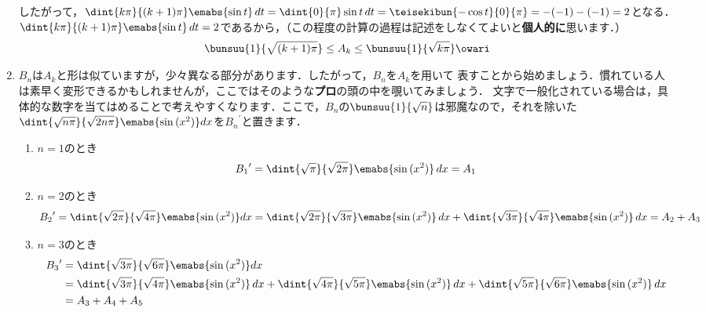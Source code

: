 \documentclass[../../../doc/main]{subfiles}
\begin{document}
\begin{enumerate}
            \textcolor{myBlue2}{したがって，$\dint{k\pi}{(k+1)\pi}\emabs{\sin{t}}\,dt=\dint{0}{\pi}\sin{t}\,dt=\teisekibun{-\cos{t}}{0}{\pi}=-(-1)-(-1)=2$となる．} \\
            $\dint{k\pi}{(k+1)\pi}\emabs{\sin{t}}\,dt=2$であるから，\textcolor{myBlue2}{（この程度の計算の過程は記述をしなくてよいと{\bf 個人的に}思います．）}
            \begin{align*}
                \bunsuu{1}{\sqrt{(k+1)\pi}}\leq A_k \leq \bunsuu{1}{\sqrt{k\pi}}\owari
            \end{align*}
            \item [\kakkoni] \textcolor{myBlue2}{$B_n$は$A_k$と形は似ていますが，少々異なる部分があります．したがって，$B_n$を$A_k$を用いて
            表すことから始めましょう．慣れている人は素早く変形できるかもしれませんが，ここではそのような{\bf プロ}の頭の中を覗いてみましょう．
            文字で一般化されている場合は，具体的な数字を当てはめることで考えやすくなります．ここで，$B_n$の$\bunsuu{1}{\sqrt{n}}$は邪魔なので，それを除いた
            $\dint{\sqrt{n\pi}}{\sqrt{2n\pi}}\emabs{\sin{(x^2)}}dx$を${B_n}^\prime$と置きます．
            \begin{enumerate}
                \item [\tokeiichi] $n=1$のとき
                \begin{align*}
                    {B_1}^\prime=\dint{\sqrt{\pi}}{\sqrt{2\pi}}\emabs{\sin{(x^2)}}\,dx=A_1
                \end{align*}
                \item [\tokeini] $n=2$のとき
                \begin{align*}
                    {B_2}^\prime&=\dint{\sqrt{2\pi}}{\sqrt{4\pi}}\emabs{\sin{(x^2)}}dx 
                    =\dint{\sqrt{2\pi}}{\sqrt{3\pi}}\emabs{\sin{(x^2)}}\,dx+\dint{\sqrt{3\pi}}{\sqrt{4\pi}}\emabs{\sin{(x^2)}}\,dx 
                    =A_2+A_3
                \end{align*}
                \item [\tokeisan] $n=3$のとき
                \begin{align*}
                    {B_3}^\prime&=\dint{\sqrt{3\pi}}{\sqrt{6\pi}}\emabs{\sin{(x^2)}}dx \\
                    &=\dint{\sqrt{3\pi}}{\sqrt{4\pi}}\emabs{\sin{(x^2)}}\,dx+\dint{\sqrt{4\pi}}{\sqrt{5\pi}}\emabs{\sin{(x^2)}}\,dx+\dint{\sqrt{5\pi}}{\sqrt{6\pi}}\emabs{\sin{(x^2)}}\,dx \\
                    &=A_3+A_4+A_5
                \end{align*}

\end{enumerate}}
\end{enumerate}
\end{document}
